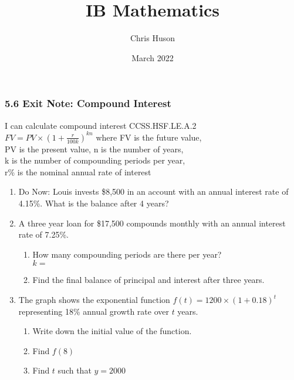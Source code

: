 \documentclass[12pt, twoside]{article}
\title{IB Mathematics}
\author{Chris Huson}
\date{March 2022}
\begin{document}
\subsubsection*{5.6 Exit Note: Compound Interest}
I can calculate compound interest \hfill CCSS.HSF.LE.A.2 \\[0.5cm]
$\displaystyle FV=PV \times \left(1+\frac{r}{100k} \right)^{kn}$
where FV is the future value,\\[0.25cm]
PV is the present value, n is the number of years, \\
 k is the number of compounding periods per year, \\
 r\% is the nominal annual rate of interest

\begin{enumerate}
\item Do Now: Louis invests \$8,500 in an account with an annual interest rate of 4.15\%. What is the balance after 4 years? \vspace{2cm}

\item A three year loan for \$17,500 compounds monthly with an annual interest rate of 7.25\%.
\begin{enumerate}[itemsep=0.5cm]
    \item How many compounding periods are there per year? \\[0.25cm]
    $k=$
    \item Find the final balance of principal and interest after three years.
\end{enumerate} \vspace{2cm}

\item The graph shows the exponential function $\displaystyle f(t)=1200 \times \left( 1+0.18 \right)^t$ representing 18\% annual growth rate over $t$ years.
\begin{multicols}{2}
    \begin{enumerate}[itemsep=1cm]
        \item Write down the initial value of the function.
        \item Find $f(8)$
        \item Find $t$ such that $y=2000$
    \end{enumerate}
    \begin{center}
\end{center}
\end{multicols}
\end{enumerate}
\end{document}
